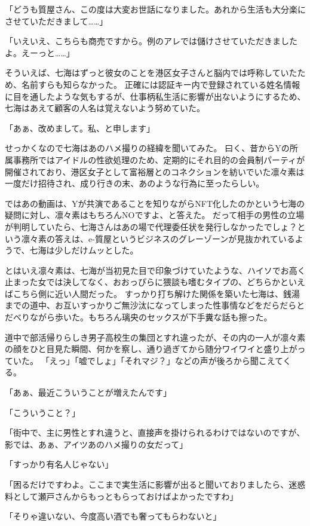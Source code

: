「どうも質屋さん、この度は大変お世話になりました。あれから生活も大分楽にさせていただきまして……」

「いえいえ、こちらも商売ですから。例のアレでは儲けさせていただきましたよ。えーっと……」

そういえば、七海はずっと彼女のことを港区女子さんと脳内では呼称していたため、名前すらも知らなかった。
正確には認証キー内で登録されている姓名情報に目を通したような気もするが、仕事柄私生活に影響が出ないようにするため、七海はあえて顧客の人名は覚えないよう努めていた。

「あぁ、改めまして。私、と申します」

せっかくなので七海はあのハメ撮りの経緯を聞いてみた。
曰く、昔からYの所属事務所ではアイドルの性欲処理のため、定期的にそれ目的の会員制パーティが開催されており、港区女子として富裕層とのコネクションを紡いでいた凛々素は一度だけ招待され、成り行きの末、あのような行為に至ったらしい。

ではあの動画は、Yが共演であることを知りながらNFT化したのかという七海の疑問に対し、凛々素はもちろんNOですよ、と答えた。
だって相手の男性の立場が判明していたら、七海さんはあの場で代理委任状を発行しなかったでしょ？という凛々素の答えは、e-質屋というビジネスのグレーゾーンが見抜かれているようで、七海は少しだけムッとした。

とはいえ凛々素は、七海が当初見た目で印象づけていたような、ハイソでお高く止まった女では決してなく、おおっぴらに猥談も嗜むタイプの、どちらかといえばこちら側に近い人間だった。
すっかり打ち解けた関係を築いた七海は、銭湯までの道中、お互いすっかりご無沙汰になってしまった性事情などをだらだらとだべりながら歩いた。もちろん璃央のセックスが下手糞な話も擦った。

道中で部活帰りらしき男子高校生の集団とすれ違ったが、その内の一人が凛々素の顔をひと目見た瞬間、何かを察し、通り過ぎてから随分ワイワイと盛り上がっていた。
「えっ」「嘘でしょ」「それマジ？」などの声が後ろから聞こえてくる。

「あぁ、最近こういうことが増えたんです」

「こういうこと？」

「街中で、主に男性とすれ違うと、直接声を掛けられるわけではないのですが、影では、あぁ、アイツあのハメ撮りの女だって」

「すっかり有名人じゃない」

「困るだけですわよ。ここまで実生活に影響が出ると聞いておりましたら、迷惑料として瀬戸さんからもっともらっておけばよかったですわ」

「そりゃ違いない、今度高い酒でも奢ってもらわないと」


